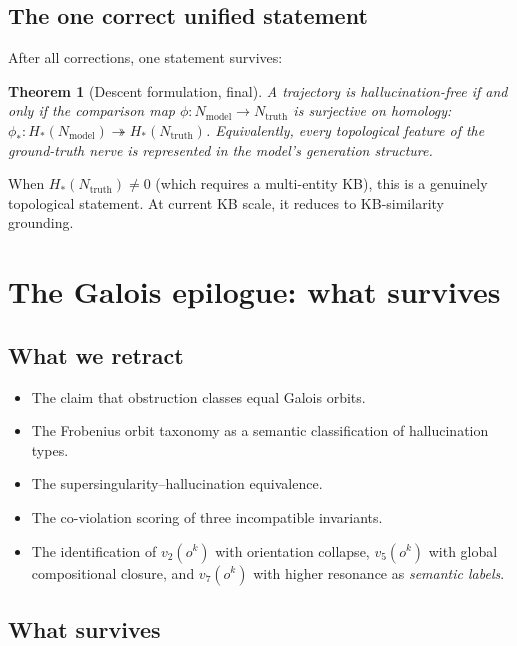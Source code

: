 \documentclass[11pt]{amsart}
\newtheorem{theorem}{Theorem}[section]
\theoremstyle{definition}
\newcommand{\Nmod}{N_{\mathrm{model}}}
\newcommand{\Ntruth}{N_{\mathrm{truth}}}
\begin{document}
\subsection{The one correct unified statement}

After all corrections, one statement survives:

\begin{theorem}[Descent formulation, final]
A trajectory is hallucination-free if and only if the comparison map
$\phi: \Nmod \to \Ntruth$ is surjective on homology:
$\phi_*: H_*(\Nmod) \twoheadrightarrow H_*(\Ntruth)$.
Equivalently, every topological feature of the ground-truth nerve
is represented in the model's generation structure.
\end{theorem}

When $H_*(\Ntruth) \neq 0$ (which requires a multi-entity KB),
this is a genuinely topological statement.
At current KB scale, it reduces to KB-similarity grounding.

\section{The Galois epilogue: what survives}
\label{sec:galois}

\subsection{What we retract}

\begin{itemize}
\item The claim that obstruction classes equal Galois orbits.
\item The Frobenius orbit taxonomy as a semantic classification of hallucination types.
\item The supersingularity--hallucination equivalence.
\item The co-violation scoring of three incompatible invariants.
\item The identification of $v_2(o^k)$ with orientation collapse,
  $v_5(o^k)$ with global compositional closure, and $v_7(o^k)$ with
  higher resonance as \emph{semantic labels}.
\end{itemize}

\subsection{What survives}
\end{document}
